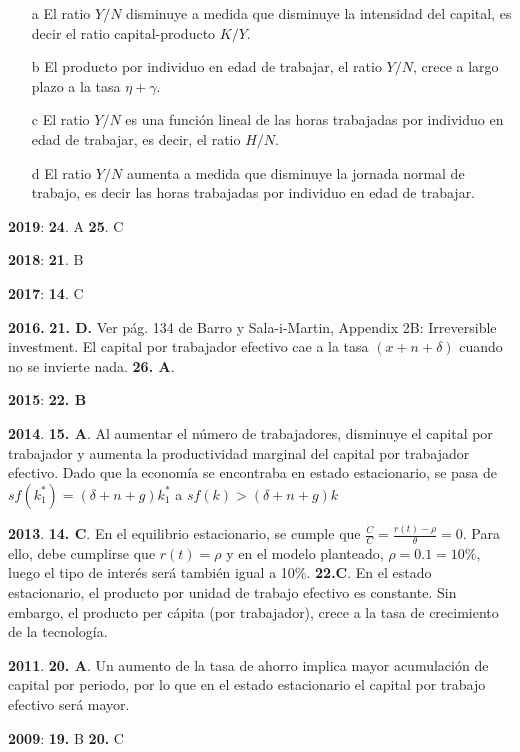 \documentclass{nuevotema}
\begin{document}
\begin{itemize}
	\item[a] El ratio $Y/N$ disminuye a medida que disminuye la intensidad del capital, es decir el ratio capital-producto $K/Y$.
	\item[b] El producto por individuo en edad de trabajar, el ratio $Y/N$, crece a largo plazo a la tasa $\eta + \gamma$.
	\item[c] El ratio $Y/N$ es una función lineal de las horas trabajadas por individuo en edad de trabajar, es decir, el ratio $H/N$.
	\item[d] El ratio $Y/N$ aumenta a medida que disminuye la jornada normal de trabajo, es decir las horas trabajadas por individuo en edad de trabajar.
\end{itemize}



\notas

\textbf{2019}: \textbf{24}. A \textbf{25}. C

\textbf{2018}: \textbf{21}. B 

\textbf{2017}: \textbf{14}. C

\textbf{2016.} \textbf{21. D.} Ver pág. 134 de Barro y Sala-i-Martin, Appendix 2B: Irreversible investment. El capital por trabajador efectivo cae a la tasa $(x+n+\delta)$ cuando no se invierte nada.  \textbf{26. A}.

\textbf{2015}: \textbf{22. B}

\textbf{2014}. \textbf{15. A}. Al aumentar el número de trabajadores, disminuye el capital por trabajador y aumenta la productividad marginal del capital por trabajador efectivo. Dado que la economía se encontraba en estado estacionario, se pasa de $sf(k^*_1) = (\delta +n +g)k^*_1$ a $sf(k) > (\delta +n +g)k$

\textbf{2013}. \textbf{14. C}. En el equilibrio estacionario, se cumple que $\frac{\dot{C}}{C} = \frac{r(t)-\rho}{\theta} = 0$. Para ello, debe cumplirse que $r(t) = \rho$ y en el modelo planteado, $\rho = 0.1 = 10\%$, luego el tipo de interés será también igual a 10\%. \textbf{22.C}. En el estado estacionario, el producto por unidad de trabajo efectivo es constante. Sin embargo, el producto per cápita (por trabajador), crece a la tasa de crecimiento de la tecnología.

\textbf{2011}. \textbf{20. A}. Un aumento de la tasa de ahorro implica mayor acumulación de capital por periodo, por lo que en el estado estacionario el capital por trabajo efectivo será mayor.

\textbf{2009}: \textbf{19.} B \textbf{20.} C
\end{document}
